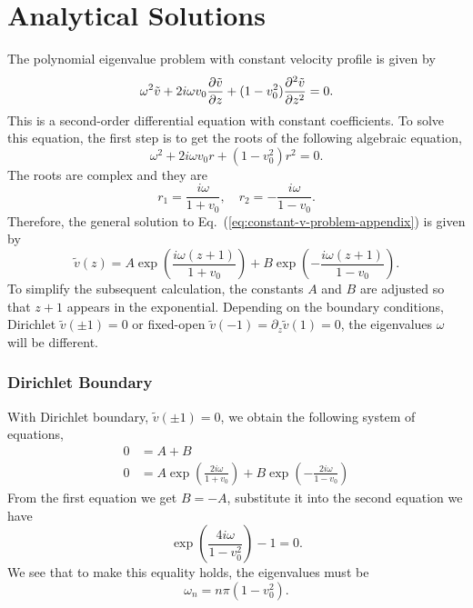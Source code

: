 \chapter{Analytical Solutions} \label{chap:analytical-solutions}
The polynomial eigenvalue problem with constant velocity profile is given by
\begin{equation}
	\omega^2\tilde{v} + 2i\omega v_0\pdv{\tilde{v}}{z} + (1-v_0^2)\pdv[2]{\tilde{v}}{z} = 0.
	\label{eq:constant-v-problem-appendix}
\end{equation}
This is a second-order differential equation with constant coefficients. To solve this equation, the first step is to get the roots of the following algebraic equation,
\begin{equation}
	\omega^2 + 2i\omega v_0 r + (1-v_0^2)r^2 = 0.
\end{equation}
The roots are complex and they are
\begin{equation}
	r_1 = \frac{i\omega}{1+v_0}, \quad r_2=-\frac{i\omega}{1-v_0}.
\end{equation}
Therefore, the general solution to Eq.~(\ref{eq:constant-v-problem-appendix}) is given by
\begin{equation}
	\tilde{v}(z) = A\exp(\frac{i\omega(z+1)}{1+v_0}) + B\exp(-\frac{i\omega(z+1)}{1-v_0}).
\end{equation}
To simplify the subsequent calculation, the constants $A$ and $B$ are adjusted so that $z+1$ appears in the exponential. Depending on the boundary conditions, Dirichlet $\tilde{v}(\pm 1) = 0$ or fixed-open $\tilde{v}(-1)=\partial_z\tilde{v}(1)=0$, the eigenvalues $\omega$ will be different.

\subsection*{Dirichlet Boundary}
With Dirichlet boundary, $\tilde{v}(\pm 1)=0$, we obtain the following system of equations,
\begin{align*}
	0 & = A + B                                                          \\
	0 & = A\exp(\frac{2i\omega}{1+v_0}) + B\exp(-\frac{2i\omega}{1-v_0})
\end{align*}
From the first equation we get $B = -A$, substitute it into the second equation we have
\begin{equation}
	\exp(\frac{4i\omega}{1-v_0^2}) - 1 = 0.
\end{equation}
We see that to make this equality holds, the eigenvalues must be
\begin{equation}
	\omega_n = n\pi(1-v_0^2).
\end{equation}


